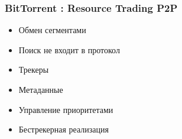\documentclass[xetex,mathserif,serif]{beamer}
\begin{document}
    \begin{frame}
        \frametitle{BitTorrent : Resource Trading P2P}
        \begin{itemize}
            \item Обмен сегментами
            \item Поиск не входит в протокол
            \item Трекеры
            \item Метаданные
            \item Управление приоритетами
            \item Бестрекерная реализация
        \end{itemize}
    \end{frame}
\end{document}
